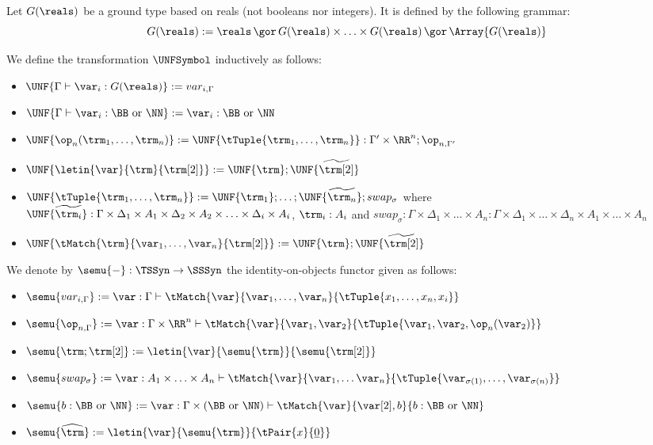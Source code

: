 Let $G(\reals)$ be a ground type based on reals (not booleans nor integers). It is defined by the following grammar:
\[G(\reals):=\reals \,\gor\, G(\reals)\times\ldots \times G(\reals)\,\gor\,\Array{G(\reals)}\]

We define the transformation $\UNFSymbol$ inductively as follows:
\begin{itemize}
	\item $\UNF{\Gamma\vdash \var_i: G(\reals)}:=var_{i,\Gamma}$
	\item $\UNF{\Gamma\vdash \var_i: \BB\text{ or }\NN}:=\var_i:\BB\text{ or }\NN$
	\item $\UNF{\op_n(\trm_1,\ldots,\trm_n)}:=\UNF{\tTuple{\trm_1,\ldots,\trm_n}}:\Gamma'\times \RR^n;\op_{n,\Gamma'}$
	\item $\UNF{\letin{\var}{\trm}{\trm[2]}}:=\UNF{\trm};\UNF{\widetilde{\trm[2]}}$
	\item $\UNF{\tTuple{\trm_1,\ldots,\trm_n}}:=\UNF{\trm_1};\ldots;\UNF{\widetilde{\trm_n}};swap_\sigma$ where $\UNF{\widetilde{\trm_i}}:\Gamma\times \Delta_1\times A_1 \times \Delta_2 \times A_2\times\ldots \times \Delta_i \times A_i$, $\trm_i:A_i$ and $swap_\sigma:\Gamma\times\Delta_1 \times \ldots \times A_n: \Gamma\times \Delta_1\times\ldots\times\Delta_n\times A_1\times\ldots\times A_n$
	\item $\UNF{\tMatch{\trm}{\var_1,\ldots,\var_n}{\trm[2]}}:=\UNF{\trm};\UNF{\widetilde{\trm[2]}}$
\end{itemize}

We denote by $\semu{-}:\TSSyn\to \SSSyn$ the identity-on-objects functor given as follows:
\begin{itemize}
	\item  $\semu{var_{i,\Gamma}}:=\var:\Gamma\vdash \tMatch{\var}{\var_1,\ldots,\var_n}{\tTuple{x_1,\ldots,x_n,x_i}}$
	\item $\semu{\op_{n,\Gamma}}:=\var:\Gamma\times\RR^n\vdash \tMatch{\var}{\var_1,\var_2}{\tTuple{\var_1,\var_2,\op_n(\var_2)}}$
	\item $\semu{\trm;\trm[2]}:=\letin{\var}{\semu{\trm}}{\semu{\trm[2]}}$
	\item $\semu{swap_\sigma}:=\var:A_1\times\ldots\times A_n\vdash\tMatch{\var}{\var_1,\ldots\var_n}{\tTuple{\var_{\sigma(1)},\ldots,\var_{\sigma(n)}}}$
	\item $\semu{b:\BB\text{ or }\NN}:=\var:\Gamma\times (\BB\text{ or }\NN)\vdash\tMatch{\var}{\var[2],b}{b:\BB\text{ or }\NN}$
	\item $\semu{\widehat{\trm}}:=\letin{\var}{\semu{\trm}}{\tPair{x}{\underline{0}}}$
\end{itemize}

